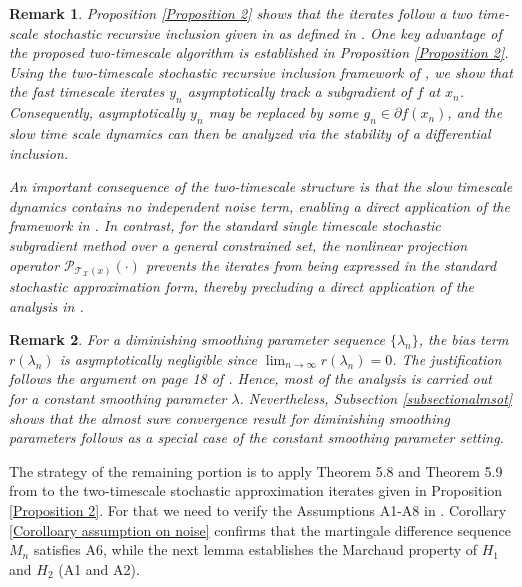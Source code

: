 \documentclass[9pt,journal,twoside,web]{ieeecolor}
\newtheorem{remark}{Remark}
\begin{document}
\begin{remark}
 Proposition \ref{Proposition 2} shows that the iterates follow a two time-scale stochastic recursive inclusion given in as defined in \cite{yaji2020stochastic}.  \color{black} 
One key advantage of the proposed two-timescale algorithm is established in Proposition \ref{Proposition 2}. Using the two-timescale stochastic recursive inclusion framework of \cite{yaji2020stochastic}, we show that the fast timescale iterates $y_n$ asymptotically track a subgradient of $f$ at $x_n$. Consequently, asymptotically $y_n$ may be replaced by some $g_n \in \partial f(x_n)$, and the slow time scale dynamics can then be analyzed via the stability of a differential inclusion.

An important consequence of the two-timescale structure is that the slow timescale dynamics contains no independent noise term, enabling a direct application of the framework in \cite{yaji2020stochastic}. In contrast, for the standard single timescale stochastic subgradient method over a general constrained set, the nonlinear projection operator $\mathcal{P}_{\mathcal{T}_\mathcal{X}(x)}(\cdot)$ prevents the iterates from being expressed in the standard stochastic approximation form, thereby precluding a direct application of the analysis in \cite{doi:10.1137/S0363012904439301}.
\label{Remark-two time scale}
\end{remark}
\begin{remark}
For a diminishing smoothing parameter sequence $\{\lambda_n\}$, the bias term $r(\lambda_n)$ is asymptotically negligible since $\lim_{n\to\infty} r(\lambda_n)=0$. The justification follows the argument on page 18 of \cite{borkar2008stochastic}. Hence, most of the analysis is carried out for a constant smoothing parameter $\lambda$. Nevertheless, Subsection \ref{subsectionalmsot} shows that the almost sure convergence result for diminishing smoothing parameters follows as a special case of the constant smoothing parameter setting.
\end{remark}
 \color{black}
The strategy of the remaining portion  is to apply Theorem 5.8 and Theorem 5.9 from \cite{yaji2020stochastic} to the two-timescale stochastic approximation iterates given in Proposition \ref{Proposition 2}.  For that we need to verify the Assumptions A1-A8 in \cite{yaji2020stochastic}. Corollary \ref{Corolloary assumption on noise} confirms that the martingale difference sequence ${M_n}$ satisfies A6, while the next lemma establishes the Marchaud property of $H_1$ and $H_2$ (A1 and A2).
\end{document}
